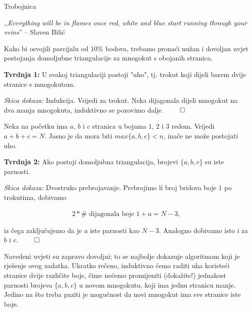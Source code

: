 \begin{statement}[
  problempoints=110,
  timelimit=1 second,
  memorylimit=512 MiB,
]{Trobojnica}



,,\textit{Everything will be in flames once red, white and blue start running through your veins}''
-- Slaven Bilić

Kako bi osvojili parcijalu od $10\%$ bodova, trebamo pronaći nužan i dovoljan uvjet postojanja
domoljubne triangulacije za mnogokut s obojanih stranica.

\textbf{Tvrdnja 1: } \; U svakoj triangulaciji postoji "uho", tj. trokut koji dijeli barem dvije
stranice s mnogokutom.

\emph{Skica dokaza: } \; Indukcija. Vrijedi za trokut.
Neka dijagonala dijeli mnogokut na dva manja mnogokuta, induktivno se pozovimo dalje. $\qed$

Neka na početku ima $a$, $b$ i $c$ stranica u bojama $1$, $2$ i $3$ redom.
Vrijedi $a+b+c = N$. Jasno je da mora biti $max\{a, b, c\} < n$, inače ne može postojati uho.

\textbf{Tvrdnja 2: } \; Ako postoji domoljubna triangulacija, brojevi $\{a, b, c\}$ su iste parnosti.

\emph{Skica dokaza: } \; Dvostruko prebrojavanje.
Prebrojimo li broj bridova boje $1$ po trokutima, dobivamo 

\begin{align*}
  2 * \text{# dijagonala boje 1} + a = N - 3,
\end{align*}

iz čega zaključujemo da je $a$ iste parnosti kao $N-3$. Analogno dobivamo isto i za $b$ i $c$. $\qed$

Navedeni uvjeti su zapravo dovoljni; to se najbolje dokazuje algoritmom koji je rješenje ovog zadatka.
Ukratko rečeno, induktivno ćemo raditi uha koristeći stranice dvije različite boje,
čime nećemo promijeniti (dokažite!) jednakost parnosti brojeva $\{a, b, c\}$ u novom mnogokutu, koji
ima jednu stranicu manje.
Jedino na što treba paziti je mogućnost da novi mnogokut ima sve stranice iste boje.


\end{statement}

